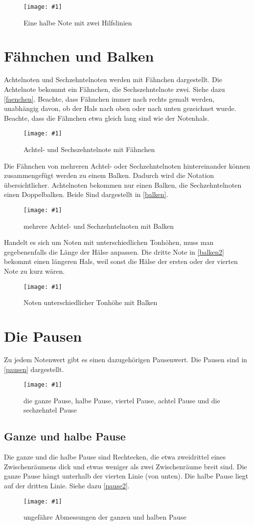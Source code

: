 \documentclass[10pt,a4paper,twoside]{report}
\newcommand{\comment}[1]{\marginpar{\begin{flushleft}
            \textsf{#1}
        \end{flushleft}}}
\newcommand{\image}[4]{
	\begin{figure}[!ht]
		\centering
		\texttt{[image: \#1]}
		\caption{#2}
		\label{#3}
	\end{figure}
}
\begin{document}
\image{img/hlinie-1.png}{Eine halbe Note mit zwei Hilfslinien}{hlinie}{5}

\section{Fähnchen und Balken}
\label{balkensection}
Achtelnoten und Sechzehntelnoten werden mit Fähnchen dargestellt. 
Die Achtelnote bekommt 
ein Fähnchen, die Sechszehntelnote zwei. Siehe dazu \autoref{faenchen}.
Beachte, dass Fähnchen immer nach rechts gemalt werden, 
unabhängig davon, ob der Hals 
nach oben oder nach unten gezeichnet wurde.
Beachte, dass die Fähnchen etwa gleich lang sind wie der Notenhals.

\image{img/faehnchen.png}{Achtel- und Sechszehntelnote mit
    Fähnchen}{faenchen}{4}%

Die Fähnchen von mehreren Achtel- oder Sechzehntelnoten hintereinander können 
zusammengefügt werden zu einem Balken. Dadurch wird die Notation übersichtlicher.
Achtelnoten bekommen nur einen Balken, die Sechzehntelnoten einen Doppelbalken. 
Beide Sind dargestellt in \autoref{balken}.

\image{img/balken.png}{mehrere Achtel- und Sechzehntelnoten 
    mit Balken}{balken}{7}

Handelt es sich um Noten mit unterschiedlichen Tonhöhen, 
muss man gegebenenfalls die 
Länge der Hälse anpassen.
Die dritte Note in \autoref{balken2} bekommt einen längeren Hals, weil sonst die
Hälse der ersten oder der vierten Note zu kurz wären.
\image{img/balken2.png}{Noten unterschiedlicher Tonhöhe 
    mit Balken}{balken2}{3.5}

\section{Die Pausen}
Zu jedem Notenwert gibt es einen dazugehörigen Pausenwert. 
Die Pausen sind in \autoref{pausen} 
dargestellt.

\image{img/pausen.png}{die ganze Pause, halbe Pause, viertel Pause, 
    achtel Pause und die sechzehntel Pause}{pausen}{6}

\subsection{Ganze und halbe Pause}
Die ganze und die halbe Pause sind Rechtecken, die etwa 
zweidrittel eines Zwischenräumens dick
und etwas weniger als zwei Zwischenräume breit sind. 
Die ganze Pause hängt unterhalb der 
vierten Linie (von unten).\comment{ganze Pause hängt}
Die halbe Pause liegt auf der dritten Linie.\comment{halbe Pause liegt}
Siehe dazu \autoref{pause2}.
\image{img/pausen2c.png}{ungefähre Abmessungen der ganzen und 
    halben Pause}{pause2}{8}
\end{document}

